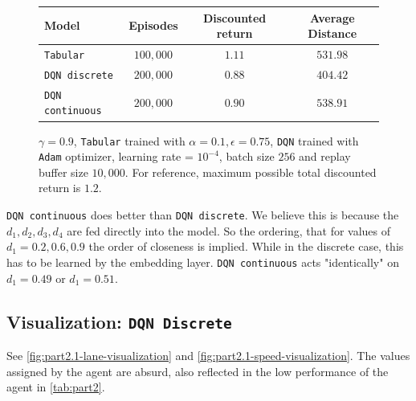\begin{figure}[H]
    \vspace{1em}
    \begin{minipage}{\linewidth}
    \centering
    \begin{tabular}{lccc}
        \hline
        Model & Episodes & Discounted return & Average Distance \\
        \hline
        \texttt{Tabular} & $100,000$&$1.11$ & $531.98$ \\
        \texttt{DQN discrete}& $200,000$& $0.88$ & $404.42$ \\
        \texttt{DQN continuous} & $200,000$& $0.90$ & $538.91$ \\
        \hline
    \end{tabular}
    \caption{$\gamma = 0.9$, \texttt{Tabular} trained with $\alpha = 0.1, \epsilon = 0.75$,  \texttt{DQN} trained with \texttt{Adam} optimizer, learning rate = $10^{-4}$, batch size $256$ and replay buffer size $10,000$. For reference, maximum possible total discounted return is $1.2$.}
    \label{tab:part2}
    \end{minipage}
     \label{fig:part2}

\end{figure}
\texttt{DQN continuous} does better than \texttt{DQN discrete}. We believe this is because the $d_1, d_2, d_3, d_4$ are fed directly into the model. So the ordering, that for values of $d_1 = 0.2, 0.6, 0.9$ the order of closeness is implied. While in the discrete case, this has to be learned by the embedding layer. \texttt{DQN continuous} acts "identically" on $d_1  = 0.49$ or $d_1 = 0.51$.
\subsection{Visualization: \texttt{DQN Discrete}}
See \autoref{fig:part2.1-lane-visualization} and \autoref{fig:part2.1-speed-visualization}. The values assigned by the agent are absurd, also reflected in the low performance of the agent in \autoref{tab:part2}.


